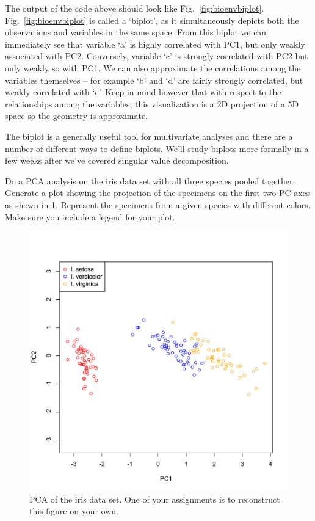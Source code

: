 The output of the code above should look  like Fig.~\ref{fig:bioenvbiplot}. Fig.~\ref{fig:bioenvbiplot} is called a `biplot', as it simultaneously depicts both the observations and variables in the same space.  From this biplot we can immediately see that variable `a' is highly correlated with PC1, but only weakly associated with PC2. Conversely, variable `c' is strongly correlated with PC2 but only weakly so with PC1. We can also approximate the correlations among the variables themselves -- for example `b' and `d' are fairly strongly correlated, but weakly correlated with `c'.  Keep in mind however that with respect to the relationships among the variables, this visualization is a 2D projection of a 5D space so the geometry is approximate.

The biplot is a generally useful tool for multivariate analyses and there are a number of different ways to define biplots. We'll study biplots more formally in a few weeks after we've covered singular value decomposition.



\bigskip

\begin{assignment}
Do a PCA analysis on the iris data set with all
three species pooled together. Generate a plot showing the projection of
the specimens on the first two PC axes as shown in \cref{fig:pca}.
Represent the specimens from a given species with different colors. Make
sure you include a legend for your plot.
\end{assignment}

\begin{figure}[htbp]
\centering
\includegraphics[width=0.5\columnwidth]{./figures/hands-on5/iris-all-pca.pdf}
\caption{PCA of the iris data set. One of your assignments is to
reconstruct this figure on your own.}\label{fig:pca}
\end{figure}

